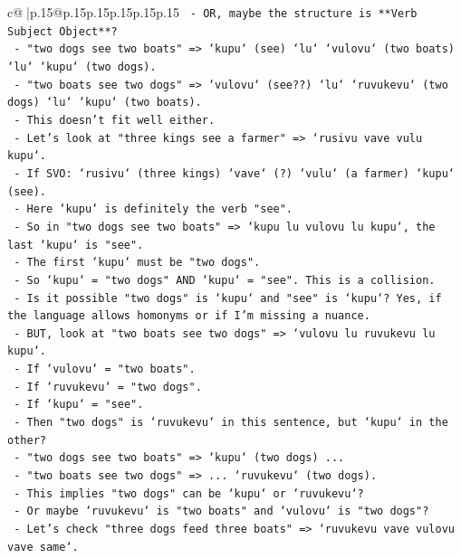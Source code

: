 \documentclass{article}
\begin{document}
{\begin{supertabular}{c@{$\;$}|p{.15\linewidth}@{}p{.15\linewidth}p{.15\linewidth}p{.15\linewidth}p{.15\linewidth}p{.15\linewidth}}
{{{\texttt{           {-} OR, maybe the structure is **Verb Subject Object**?} \\
\texttt{             {-} "two dogs see two boats" => `kupu` (see) `lu` `vulovu` (two boats) `lu` `kupu` (two dogs).} \\
\texttt{             {-} "two boats see two dogs" => `vulovu` (see??) `lu` `ruvukevu` (two dogs) `lu` `kupu` (two boats).} \\
\texttt{             {-} This doesn't fit well either.} \\
\texttt{           {-} Let's look at "three kings see a farmer" => `rusivu vave vulu kupu`.} \\
\texttt{             {-} If SVO: `rusivu` (three kings) `vave` (?) `vulu` (a farmer) `kupu` (see).} \\
\texttt{             {-} Here `kupu` is definitely the verb "see".} \\
\texttt{             {-} So in "two dogs see two boats" => `kupu lu vulovu lu kupu`, the last `kupu` is "see".} \\
\texttt{             {-} The first `kupu` must be "two dogs".} \\
\texttt{             {-} So `kupu` = "two dogs" AND `kupu` = "see". This is a collision.} \\
\texttt{             {-} Is it possible "two dogs" is `kupu` and "see" is `kupu`? Yes, if the language allows homonyms or if I'm missing a nuance.} \\
\texttt{             {-} BUT, look at "two boats see two dogs" => `vulovu lu ruvukevu lu kupu`.} \\
\texttt{               {-} If `vulovu` = "two boats".} \\
\texttt{               {-} If `ruvukevu` = "two dogs".} \\
\texttt{               {-} If `kupu` = "see".} \\
\texttt{               {-} Then "two dogs" is `ruvukevu` in this sentence, but `kupu` in the other?} \\
\texttt{               {-} "two dogs see two boats" => `kupu` (two dogs) ...} \\
\texttt{               {-} "two boats see two dogs" => ... `ruvukevu` (two dogs).} \\
\texttt{               {-} This implies "two dogs" can be `kupu` or `ruvukevu`?} \\
\texttt{               {-} Or maybe `ruvukevu` is "two boats" and `vulovu` is "two dogs"?} \\
\texttt{               {-} Let's check "three dogs feed three boats" => `ruvukevu vave vulovu vave same`.} \\
}}}
\end{supertabular}}
\end{document}
